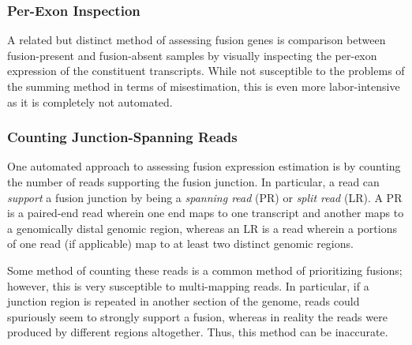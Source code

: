 \subsubsection{Per-Exon Inspection}

A related but distinct method of assessing fusion genes is comparison between fusion-present and fusion-absent samples by visually inspecting the per-exon expression of the constituent transcripts. While not susceptible to the problems of the summing method in terms of misestimation, this is even more labor-intensive as it is completely not automated.

\subsubsection{Counting Junction-Spanning Reads}

One automated approach to assessing fusion expression estimation is by counting the number of reads supporting the fusion junction. In particular, a read can \textit{support} a fusion junction by being a \textit{spanning read} (PR) or \textit{split read} (LR). A PR is a paired-end read wherein one end maps to one transcript and another maps to a genomically distal genomic region, whereas an LR is a read wherein a portions of one read (if applicable) map to at least two distinct genomic regions.

Some method of counting these reads is a common method of prioritizing fusions; however, this is very susceptible to multi-mapping reads. In particular, if a junction region is repeated in another section of the genome, reads could spuriously seem to strongly support a fusion, whereas in reality the reads were produced by different regions altogether. Thus, this method can be inaccurate. 












